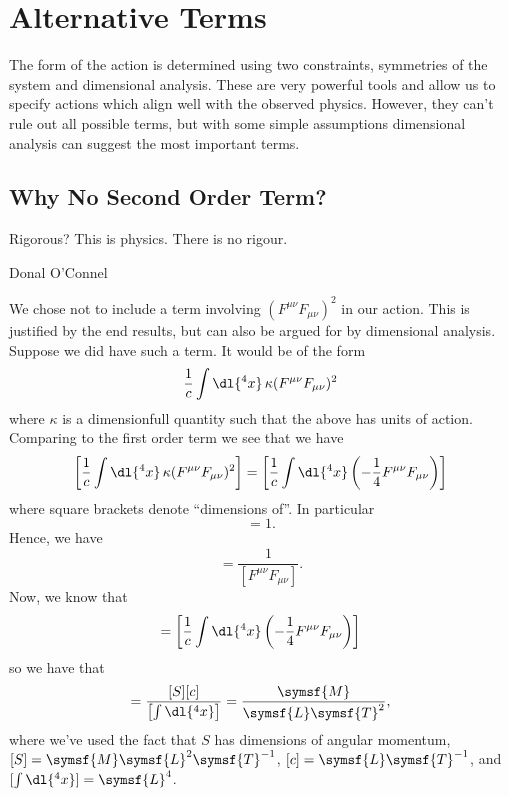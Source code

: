 \documentclass[fleqn]{NotesClass}
\newcommand*{\dimension}[1]{\symsf{#1}}
\begin{document}
    \section{Alternative Terms}
    The form of the action is determined using two constraints, symmetries of the system and dimensional analysis.
    These are very powerful tools and allow us to specify actions which align well with the observed physics.
    However, they can't rule out all possible terms, but with some simple assumptions dimensional analysis can suggest the most important terms.
    
    \subsection{Why No Second Order Term?}
    \epigraph{Rigorous? This is physics. There is no rigour.}{Donal O'Connel}
    We chose not to include a term involving \((F^{\mu\nu}F_{\mu\nu})^2\) in our action.
    This is justified by the end results, but can also be argued for by dimensional analysis.
    Suppose we did have such a term.
    It would be of the form
    \begin{equation}
        \frac{1}{c} \int \dl{^4x} \, \kappa(F^{\mu\nu}F_{\mu\nu})^2
    \end{equation}
    where \(\kappa\) is a dimensionfull quantity such that the above has units of action.
    Comparing to the first order term we see that we have
    \begin{equation}
        \left[ \frac{1}{c} \int \dl{^4x} \, \kappa(F^{\mu\nu}F_{\mu\nu})^2 \right] = \left[ \frac{1}{c} \int \dl{^4x} \left( -\frac{1}{4}F^{\mu\nu}F_{\mu\nu} \right) \right]
    \end{equation}
    where square brackets denote \enquote{dimensions of}.
    In particular
    \begin{equation}
        [\kappa F^{\mu\nu}F_{\mu\nu}] = 1.
    \end{equation}
    Hence, we have
    \begin{equation}
        [\kappa] = \frac{1}{[F^{\mu\nu}F_{\mu\nu}]}.
    \end{equation}
    Now, we know that
    \begin{equation}
        [S] = \left[ \frac{1}{c} \int \dl{^4x} \left( -\frac{1}{4}F^{\mu\nu}F_{\mu\nu} \right) \right]
    \end{equation}
    so we have that
    \begin{equation}
        [F^{\mu\nu}F_{\mu\nu}] = \frac{[S][c]}{\left[ \int \dl{^4x} \right]} = \frac{\dimension{M}}{\dimension{L}\dimension{T}^2},
    \end{equation}
    where we've used the fact that \(S\) has dimensions of angular momentum, \([S] = \dimension{M}\dimension{L}^2\dimension{T}^{-1}\), \([c] = \dimension{L}\dimension{T}^{-1}\), and \([\int \dl{^4x}] = \dimension{L}^4\).
    
\end{document}

